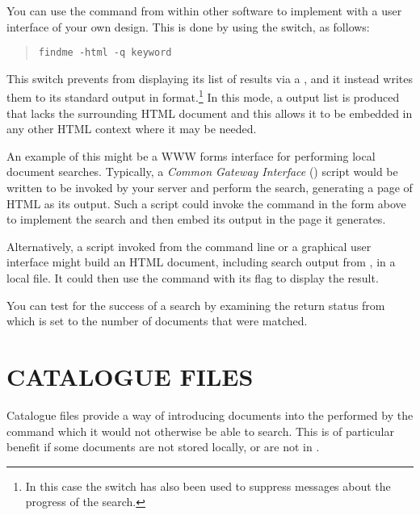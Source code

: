 You can use the  command from within other
software to implement  with a user interface of your
own design. This is done by using the  switch, as follows:

\begin{quote}
\begin{verbatim}
findme -html -q keyword
\end{verbatim}
\end{quote}

This switch prevents  from displaying its list of results
via a , and it instead
writes them to its standard output in 
format.\footnote{In this case the  switch has also been used to
suppress messages about the progress of the search.} In this mode, a
 output list is produced that lacks the surrounding HTML
document and this allows it to be embedded in any other HTML context
where it may be needed.

An example of this might be a WWW forms interface for
performing local document searches. Typically, a {\em Common Gateway
Interface} () script would be written to be invoked by
your  server and perform the search, generating a page of
HTML as its output. Such a script could invoke the  command
in the form above to implement the search and then embed its output in
the page it generates.

Alternatively, a script invoked from the command line or a graphical
user interface might build an HTML document, including search output
from , in a local file. It could then use the
 command with its  flag to display the
result.

You can test for the success of a search by examining the return
status from  which is set to the number of documents that
were matched.

\section{\label{sect:cataloguefiles}CATALOGUE FILES}

Catalogue files provide a way of introducing documents into the
 performed by the
 command which it would not otherwise be able
to search. This is of particular benefit if some documents are not
stored locally, or are not in .

